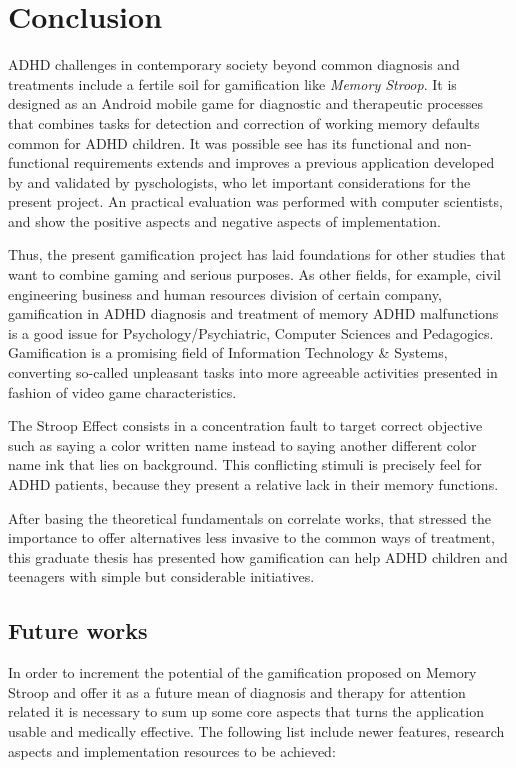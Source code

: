 \chapter{Conclusion}
\label{ch:conclusion}

ADHD challenges in contemporary society beyond common diagnosis and treatments include a fertile soil for gamification like \textit{Memory Stroop}. It is designed as an Android mobile game for diagnostic and therapeutic processes that combines tasks for detection and correction of working memory defaults common for ADHD children. It was possible see has its functional and non-functional requirements extends and improves a previous application developed by \cite{Villa} and validated by pyschologists, who let important considerations for the present project. An practical evaluation was performed with computer scientists, and show the positive aspects and negative aspects of implementation.

Thus, the present gamification project has laid foundations for other studies that want to combine gaming and serious purposes.  As other fields, for example, civil engineering business and human resources division of certain company, gamification in ADHD diagnosis and treatment of memory ADHD malfunctions is a good issue for Psychology/Psychiatric, Computer Sciences and Pedagogics. Gamification is a promising field of Information Technology \& Systems, converting so-called unpleasant tasks into more agreeable activities presented in fashion of video game characteristics. 

The Stroop Effect consists in a concentration fault to target correct objective such as saying a color written name instead to saying another different color name ink that lies on background. This conflicting stimuli is precisely feel for ADHD patients, because they present a relative lack in their memory functions.

After basing the theoretical fundamentals on correlate works, that stressed the importance to offer alternatives less invasive to the common ways of treatment, this graduate thesis has presented how gamification can help ADHD children and teenagers with simple but considerable initiatives.

\section{Future works}

In order to increment the potential of the gamification proposed on Memory Stroop and offer it as a future mean of diagnosis and therapy for attention related it is necessary to sum up some core aspects that turns the application usable and medically effective. The following list include newer features, research aspects and implementation resources to be achieved:

